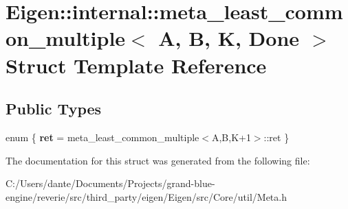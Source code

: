 \hypertarget{struct_eigen_1_1internal_1_1meta__least__common__multiple}{}\section{Eigen\+::internal\+::meta\+\_\+least\+\_\+common\+\_\+multiple$<$ A, B, K, Done $>$ Struct Template Reference}
\label{struct_eigen_1_1internal_1_1meta__least__common__multiple}
\subsection*{Public Types}
\begin{DoxyCompactItemize}
\item 
\mbox{\label{struct_eigen_1_1internal_1_1meta__least__common__multiple_a49d2d74e9459150c142eb091749545d6}} 
enum \{ {\bfseries ret} = meta\+\_\+least\+\_\+common\+\_\+multiple$<$A,B,K+1$>$\+::ret
 \}
\end{DoxyCompactItemize}


The documentation for this struct was generated from the following file\+:\begin{DoxyCompactItemize}
\item 
C\+:/\+Users/dante/\+Documents/\+Projects/grand-\/blue-\/engine/reverie/src/third\+\_\+party/eigen/\+Eigen/src/\+Core/util/Meta.\+h\end{DoxyCompactItemize}

